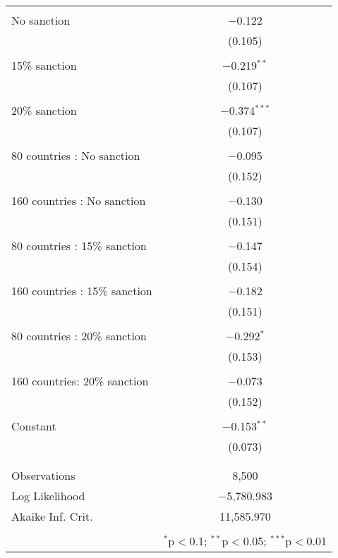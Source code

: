\documentclass[12pt,letterpaper]{article}
\begin{document}
\begin{enumerate}
\begin{enumerate}
\begin{table}[!htbp]
\begin{tabular}{@{\extracolsep{5pt}}lc}
		 		& \\  No sanction & $-$0.122 \\   & (0.105) \\   & \\  15\% sanction & $-$0.219$^{**}$ \\   & (0.107) \\   & \\  20\% sanction & $-$0.374$^{***}$ \\   & (0.107) \\   & \\  80 countries : No sanction & $-$0.095 \\   & (0.152) \\   & \\  160 countries : No sanction & $-$0.130 \\   & (0.151) \\   & \\  80 countries : 15\% sanction & $-$0.147 \\   & (0.154) \\   & \\  160 countries : 15\% sanction & $-$0.182 \\   & (0.151) \\   & \\  80 countries : 20\% sanction & $-$0.292$^{*}$ \\   & (0.153) \\   & \\  160 countries: 20\% sanction & $-$0.073 \\   & (0.152) \\   & \\  Constant & $-$0.153$^{**}$ \\   & (0.073) \\   & \\ \hline \\[-1.8ex] Observations & 8,500 \\ Log Likelihood & $-$5,780.983 \\ Akaike Inf. Crit. & 11,585.970 \\ 
		 		\hline 
		 		\hline \\
		 		[-1.8ex] \textit & \multicolumn{1}{r}{$^{*}$p$<$0.1; $^{**}$p$<$0.05; $^{***}$p$<$0.01} \\
		 	\end{tabular} 
		 \end{table} 
		 
		 \vspace{.15cm}
		 

		 
	
	\end{enumerate}
\end{enumerate}
\end{document}
